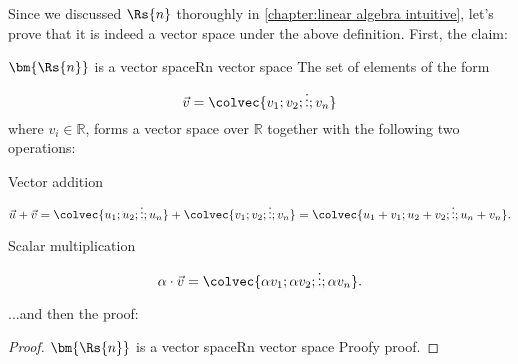 Since we discussed $\Rs{n}$ thoroughly in \autoref{chapter:linear algebra intuitive}, let's prove that it is indeed a vector space under the above definition. First, the claim:

\begin{theorem}{$\bm{\Rs{n}}$ is a vector space}{Rn vector space}
	The set of elements of the form
	\[
		\vec{v} = \colvec{v_{1};v_{2};\vdots;v_{n}}
	\]
	where $v_{i}\in\mathbb{R}$, forms a vector space over $\mathbb{R}$ together with the following two operations:
	\begin{descitemize}
		\item[Vector addition]
			\[
				\vec{u}+\vec{v} = \colvec{u_{1};u_{2};\vdots;u_{n}} + \colvec{v_{1};v_{2};\vdots;v_{n}} = \colvec{u_{1}+v_{1};u_{2}+v_{2};\vdots;u_{n}+v_{n}}.
			\]
		\item[Scalar multiplication]
			\[
				\alpha\cdot\vec{v} = \colvec{\alpha v_{1};\alpha v_{2};\vdots;\alpha v_{n}}.
			\]
	\end{descitemize}
\end{theorem}

...and then the proof:

\begin{proof}{$\bm{\Rs{n}}$ is a vector space}{Rn vector space}
	Proofy proof.
\end{proof}

